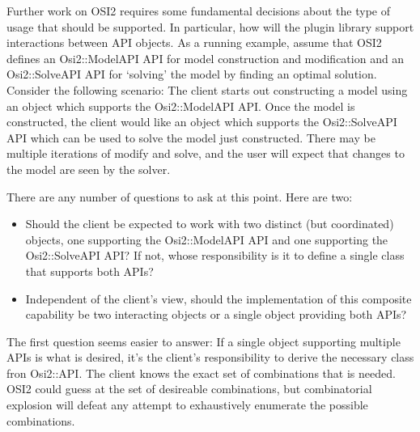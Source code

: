 \documentclass{article}
\newcommand{\OsiTwo}{OSI2\xspace}
\newcommand{\OsiTwoTop}{Osi2::API\xspace}
\newcommand{\OsiTwoModel}{Osi2::ModelAPI\xspace}
\newcommand{\OsiTwoSolve}{Osi2::SolveAPI\xspace}
\begin{document}

Further work on \OsiTwo requires some fundamental decisions about the type of
usage that should be supported.
In particular, how will the plugin library support interactions between
API objects.
As a running example,
assume that \OsiTwo defines an \OsiTwoModel API for model construction and
modification and an \OsiTwoSolve API for `solving' the model by finding an
optimal solution.
Consider the following scenario:
The client starts out constructing a model using an object which supports the
\OsiTwoModel API\@.
Once the model is constructed, the client would like an object which supports
the \OsiTwoSolve API which can be used to solve the model just constructed.
There may be multiple iterations of modify and solve, and the user will expect
that changes to the model are seen by the solver.

There are any number of questions to ask at this point.
Here are two:
\begin{itemize}
  \item
  Should the client be expected to work with two distinct (but coordinated)
  objects, one supporting the \OsiTwoModel API and one supporting the
  \OsiTwoSolve API?
  If not, whose responsibility is it to define a single class that supports
  both APIs?

  \item
  Independent of the client's view, should the implementation of this composite
  capability be two interacting objects or a single object providing both
  APIs?
\end{itemize}

The first question seems easier to answer: If a single object supporting
multiple APIs is what is desired, it's the client's responsibility to derive
the necessary class fron \OsiTwoTop.
The client knows the exact set of combinations that is needed.
\OsiTwo could guess at the set of desireable combinations, but combinatorial
explosion will defeat any attempt to exhaustively enumerate the possible
combinations.
\end{document}
